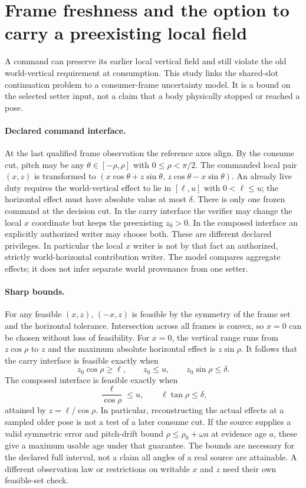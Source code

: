 \documentclass{article}
\begin{document}
\section*{Frame freshness and the option to carry a preexisting local field}
A command can preserve its earlier local vertical field and still
violate the old world-vertical requirement at consumption. This
study links the shared-slot continuation problem to a consumer-frame
uncertainty model. It is a bound on the selected setter input, not a
claim that a body physically stopped or reached a pose.

\paragraph{Declared command interface.}
At the last qualified frame observation the reference axes align.
By the consume cut, pitch may be any $\theta\in[-\rho,\rho]$
with $0\le\rho<\pi/2$. The commanded local pair $(x,z)$ is
transformed to $(x\cos\theta+z\sin\theta,\,
z\cos\theta-x\sin\theta)$. An already live duty requires the
world-vertical effect to lie in $[\ell,u]$ with $0<\ell\le u$;
the horizontal effect must have absolute value at most $\delta$.
There is only one frozen command at the decision cut. In the
carry interface the verifier may change the local $x$ coordinate
but keeps the preexisting $z_0>0$. In the composed interface an
explicitly authorized writer may choose both.
These are different declared privileges. In particular the local
$x$ writer is not by that fact an authorized, strictly
world-horizontal contribution writer. The model compares aggregate
effects; it does not infer separate world provenance from one setter.

\paragraph{Sharp bounds.}
For any feasible $(x,z)$, $( -x,z)$ is feasible by the symmetry of
the frame set and the horizontal tolerance. Intersection across all
frames is convex, so $x=0$ can be chosen without loss of feasibility.
For $x=0$, the vertical range runs from $z\cos\rho$ to $z$ and
the maximum absolute horizontal effect is $z\sin\rho$. It follows
that the carry interface is feasible exactly when
\[
z_0\cos\rho\ge \ell,\qquad z_0\le u,\qquad z_0\sin\rho\le\delta .
\]
The composed interface is feasible exactly when
\[
\frac{\ell}{\cos\rho}\le u,\qquad \ell\tan\rho\le\delta ,
\]
attained by $z=\ell/\cos\rho$. In particular, reconstructing the
actual effects at a sampled older pose is not a test of a later
consume cut. If the source supplies a valid symmetric error and
pitch-drift bound $\rho\le\rho_0+\omega a$ at evidence age $a$,
these give a maximum usable age under that guarantee. The
bounds are necessary for the declared full interval, not a
claim all angles of a real source are attainable. A different
observation law or restrictions on writable $x$ and $z$ need
their own feasible-set check.
\end{document}
